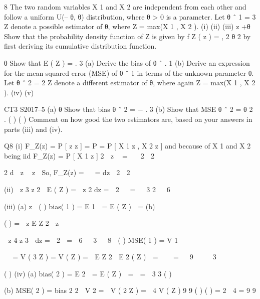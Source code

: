 \documentclass[a4paper,12pt]{article}
\begin{document}
8
The two random variables X 1 and X 2 are independent from each other and follow a
uniform U(– θ, θ) distribution, where θ > 0 is a parameter.
Let θ ˆ 1 = 3 Z denote a possible estimator of θ, where Z = max(X 1 , X 2 ).
(i)
(ii)
(iii)
z +θ
Show that the probability density function of Z is given by f Z ( z ) =
,
2 θ 2
by first deriving its cumulative distribution function.

θ
Show that E ( Z ) = .
3
(a)
Derive the bias of θ ˆ .
1
(b)
Derive an expression for the mean squared error (MSE) of θ ˆ 1 in terms
of the unknown parameter θ.
Let θ ˆ 2 = 2 Z denote a different estimator of θ, where again Z = max(X 1 , X 2 ).
(iv)
(v)

CT3 S2017–5
(a) θ
Show that bias θ ˆ 2 = − .
3
(b) Show that MSE θ ˆ 2 = θ 2 .
( )
( )
Comment on how good the two estimators are, based on your answers in parts
(iii) and (iv).




Q8
(i)
F_Z(z) \;=\; P [ z \leq z ] \;=\; P  \;=\; P [ X 1 \leq z , X 2 \leq z ] 
and because of X 1 and X 2 being iid 
F_Z(z) \;=\; P [ X 1 \leq z ]
2
 z \theta 
\;=\;

 2 \theta 
2

2
d  z \theta 
z \theta
So, F_Z(z) \;=\; 
 \;=\;
dz  2 \theta 
2 
\theta

\theta
(ii)  z 3 z 2 
\theta
E ( Z ) \;=\;  z 2 dz \;=\;  2   \;= \theta  
3
2 \theta
  6 \theta
\theta
\theta

(iii) (a)
z \theta
( )
bias( \hat{\theta}1 ) \;=\; E \hat{\theta}1  \theta \;= E ( Z )  \theta \;=
\theta
(b)

( ) \;=\;  z
E Z
2

z  

\theta
 z 4 z 3 
dz \;=\;  2 
\;=\;

6 \theta  
3
  8 \theta
\theta
( )
MSE( \hat{\theta}1 ) \;=\; V \hat{\theta}1


   
\;=\; V ( 3 Z ) \;= V ( Z ) \;=  E Z 2  E 2 ( Z )  \;=    \;= 


9  
  3


( )
(iv)
(a)
\theta
\theta
bias( \hat{\theta}2 ) \;=\; E \hat{\theta}2  \theta \;= E ( Z )  \theta \;=  \theta \;=\; 
3
3
( )

(b)
MSE( \hat{\theta}2 ) \;=\; bias 2 \hat{\theta}2  V \hat{\theta}2 \;=\;
 V ( 2 Z ) \;=\;
 4 V ( Z )
9
9
( ) ( )
\;=\;
2 
 4
\;=\; 
9
9
\end{document}
